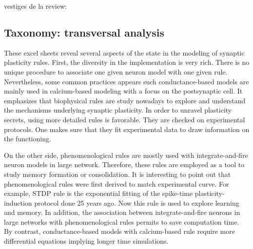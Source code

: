 vestiges de la review: \\

\subsection{Taxonomy: transversal analysis }
These excel sheets reveal several aspects of the state in the modeling of synaptic plasticity rules. First, the diversity in the implementation is very rich. There is no unique procedure to associate one given neuron model with one given rule. Nevertheless, some common practices appears such conductance-based models are mainly used in calcium-based modeling with a focus on the postsynaptic cell. It emphasizes that biophysical rules are study nowadays to explore and understand the mechanisms underlying synaptic plasticity. In order to unravel plasticity secrets, using more detailed rules is favorable. They are checked on experimental protocols. One makes sure that they fit experimental data to draw information on the functioning. 

On the other side, phenomenological rules are mostly used with integrate-and-fire neuron models in large network. Therefore, these rules are employed as a tool to study memory formation or consolidation. It is interesting to point out that phenomenological rules were first derived to match experimental curve. For example, STDP rule is the exponential fitting of the spike-time plasticity-induction protocol done 25 years ago. Now this rule is used to explore learning and memory. In addition, the association between integrate-and-fire neurons in large networks with phenomenological rules permits to save computation time. By contrast, conductance-based models with calcium-based rule require more differential equations implying longer time simulations.

